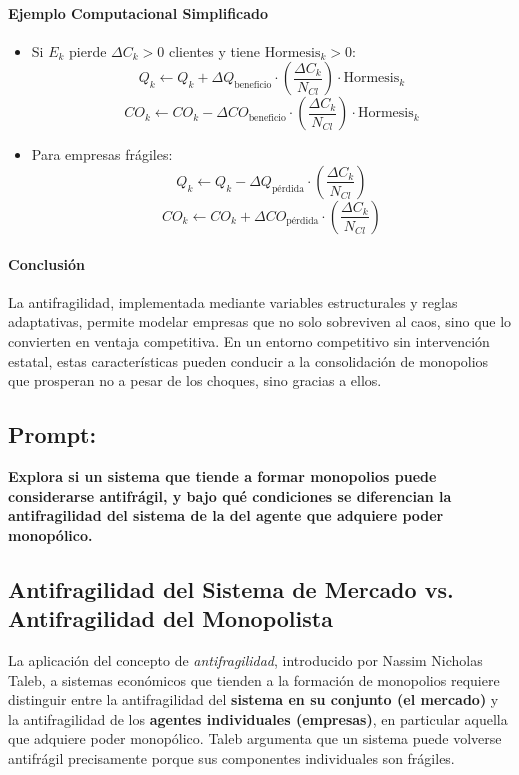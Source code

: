 \documentclass[a4paper,12pt]{article}
\begin{document}
\paragraph{Ejemplo Computacional Simplificado}

\begin{itemize}
    \item Si $E_k$ pierde $\Delta C_k > 0$ clientes y tiene $\text{Hormesis}_k > 0$:
    \[
    Q_k \leftarrow Q_k + \Delta Q_{\text{beneficio}} \cdot \left( \frac{\Delta C_k}{N_{Cl}} \right) \cdot \text{Hormesis}_k
    \]
    \[
    CO_k \leftarrow CO_k - \Delta CO_{\text{beneficio}} \cdot \left( \frac{\Delta C_k}{N_{Cl}} \right) \cdot \text{Hormesis}_k
    \]

    \item Para empresas frágiles:
    \[
    Q_k \leftarrow Q_k - \Delta Q_{\text{pérdida}} \cdot \left( \frac{\Delta C_k}{N_{Cl}} \right)
    \]
    \[
    CO_k \leftarrow CO_k + \Delta CO_{\text{pérdida}} \cdot \left( \frac{\Delta C_k}{N_{Cl}} \right)
    \]
\end{itemize}

\paragraph{Conclusión}

La antifragilidad, implementada mediante variables estructurales y reglas adaptativas, permite modelar empresas que no solo sobreviven al caos, sino que lo convierten en ventaja competitiva. En un entorno competitivo sin intervención estatal, estas características pueden conducir a la consolidación de monopolios que prosperan no a pesar de los choques, sino gracias a ellos.

\subsection*{Prompt:}
\textbf{Explora si un sistema que tiende a formar monopolios puede considerarse antifrágil, y bajo qué condiciones se diferencian la antifragilidad del sistema de la del agente que adquiere poder monopólico.}

\subsection*{Antifragilidad del Sistema de Mercado vs. Antifragilidad del Monopolista}

La aplicación del concepto de \textit{antifragilidad}, introducido por Nassim Nicholas Taleb, a sistemas económicos que tienden a la formación de monopolios requiere distinguir entre la antifragilidad del \textbf{sistema en su conjunto (el mercado)} y la antifragilidad de los \textbf{agentes individuales (empresas)}, en particular aquella que adquiere poder monopólico. Taleb argumenta que un sistema puede volverse antifrágil precisamente porque sus componentes individuales son frágiles.
\end{document}

